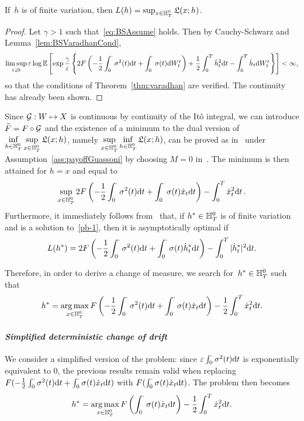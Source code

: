 \begin{lemma}
If~$\dot{h}$ is of finite variation, then 
$L(h) = \sup_{x \in \mathbb{H}_T^0}\mathfrak{L}(x;h)$.
\end{lemma}
\begin{proof}
Let $\gamma>1$ such that~\eqref{eq:BSAssume} holds. Then by Cauchy-Schwarz and Lemma~\ref{lem:BSVaradhanCond},
$$
\limsup\limits_{\varepsilon\downarrow 0} \varepsilon \log\mathbb{E}\left[\exp\frac{\gamma}{\varepsilon}\left\{2F\left(-\frac{1}{2}\int_0^\cdot \sigma^2(t)\mathrm{d} t + \int_0^\cdot \sigma(t) \mathrm{d} W_t^\varepsilon\right) + \frac{1}{2}\int_0^T \dot{h}_t^2\mathrm{d} t - \int_0^T \dot{h}_t \mathrm{d} W_t^{\varepsilon} \right\}\right] <\infty,
$$
so that the conditions of Theorem~\ref{thm:varadhan} are verified.
The continuity has already been shown.
\end{proof}
Since $\mathcal{G}: W\mapsto X$ is continuous by continuity of the It\^{o} integral, we can introduce $\widetilde F =\nobreak F\circ\mathcal{G}$ and the existence of a minimum to the dual version of 
$\inf\limits_{h \in \mathbb{H}_T^0} \sup\limits_{x \in \mathbb{H}_T^0} \mathfrak{L}(x;h)$,
namely $\sup\limits_{x \in \mathbb{H}_T^0} \inf\limits_{h \in \mathbb{H}_T^0}\mathfrak{L}(x;h)$,
can be proved as in~\cite{Guasoni2007OptimalTime} under Assumption~\ref{ass:payoffGuassoni} by choosing $M=0$ in~\cite[Lemma~7.1]{Guasoni2007OptimalTime}. 
The minimum is then attained  for $h=x$ and equal to 
\begin{equation}\label{pb-1}
    \sup\limits_{x \in \mathbb{H}_T^0}2F\left(-\frac{1}{2}\int_0^\cdot \sigma^2(t)\mathrm{d} t + \int_0^\cdot \sigma(t) \dot{x}_t \mathrm{d} t\right)
 - \int_0^T \dot{x}_t^2 \mathrm{d} t\,.
\end{equation}
Furthermore, it immediately follows from~\cite[Theorem~3.6]{Guasoni2007OptimalTime} that, if $h^*\in \mathbb{H}_T^0$ is of finite variation and is a solution to~\eqref{pb-1}, then it is asymptotically optimal if
$$
L(h^{*}) = 2F\left(-\frac{1}{2}\int_0^\cdot \sigma^2(t)\mathrm{d} t + \int_0^\cdot \sigma(t) \dot{h}^{*}_t \mathrm{d} t\right) - \int_0^T |\dot{h}^{*}_t|^2 \mathrm{d} t.
$$

Therefore, in order to derive a change of measure, we search for~$h^{*} \in \mathbb{H}_T^0$ such that
$$
h^{*} = \operatorname*{arg\,max}\limits_{x \in \mathbb{H}_T^0}F\left(-\frac{1}{2}\int_0^\cdot \sigma^2(t)\mathrm{d} t + \int_0^\cdot \sigma(t) \dot{x}_t \mathrm{d} t\right)
 - \frac{1}{2}\int_0^T \dot{x}_t^2 \mathrm{d} t.
$$

\paragraph{\textit{Simplified deterministic change of drift}}
We consider a simplified version of the problem:
since $\varepsilon\int_0^\cdot\sigma^2(t)\mathrm{d} t$ is exponentially equivalent to $0$, the previous results remain valid 
when replacing $F(-\frac{1}{2}\int_0^\cdot \sigma^2(t)\mathrm{d} t + \int_0^\cdot \sigma(t) \dot{x}_t \mathrm{d} t)$ with $F(\int_0^\cdot \sigma(t) \dot{x}_t \mathrm{d} t)$. 
The problem then becomes
$$
h^{*} = \operatorname*{arg\,max}\limits_{x \in \mathbb{H}_T^0} F\left(\int_0^\cdot \sigma(t) \dot{x}_t \mathrm{d} t\right) - \frac{1}{2}\int_0^T \dot{x}_t^2 \mathrm{d} t.
$$

